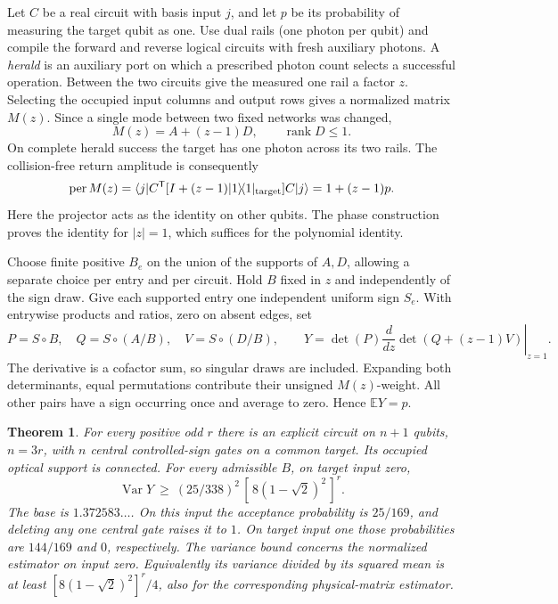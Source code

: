 \documentclass[11pt]{article}
\newtheorem{theorem}{Theorem}
\DeclareMathOperator{\per}{per}
\DeclareMathOperator{\Var}{Var}
\newcommand{\E}{\mathbb E}
\newcommand{\ket}[1]{\lvert #1\rangle}
\newcommand{\bra}[1]{\langle #1\rvert}
\begin{document}
Let \(C\) be a real circuit with basis input \(j\), and let \(p\) be its probability of measuring the target qubit as one. Use dual rails (one photon per qubit) and compile the forward and reverse logical circuits with fresh auxiliary photons. A \emph{herald} is an auxiliary port on which a prescribed photon count selects a successful operation. Between the two circuits give the measured one rail a factor \(z\). Selecting the occupied input columns and output rows gives a normalized matrix \(M(z)\). Since a single mode between two fixed networks was changed,
\[
 M(z)=A+(z-1)D,\qquad \operatorname{rank}D\le1.
\]
On complete herald success the target has one photon across its two rails. The collision-free return amplitude is consequently
\begin{equation}
 \per M(z)=\bra j C^\mathsf T[I+(z-1)\ket1\!\bra1_{\rm target}]C\ket j
          =1+(z-1)p. \label{eq:mark}
\end{equation}
Here the projector acts as the identity on other qubits. The phase construction proves the identity for \(|z|=1\), which suffices for the polynomial identity.

Choose finite positive \(B_e\) on the union of the supports of \(A,D\), allowing a separate choice per entry and per circuit. Hold \(B\) fixed in \(z\) and independently of the sign draw. Give each supported entry one independent uniform sign \(S_e\). With entrywise products and ratios, zero on absent edges, set
\[
 P=S\circ B,\quad Q=S\circ(A/B),\quad V=S\circ(D/B),\qquad
 Y=\det(P)\left.\frac{d}{dz}\det(Q+(z-1)V)\right|_{z=1}.
\]
The derivative is a cofactor sum, so singular draws are included. Expanding both determinants, equal permutations contribute their unsigned \(M(z)\)-weight. All other pairs have a sign occurring once and average to zero. Hence \(\E Y=p\).

\begin{theorem}\label{thm:main}
For every positive odd \(r\) there is an explicit circuit on \(n+1\) qubits, \(n=3r\), with \(n\) central controlled-sign gates on a common target. Its occupied optical support is connected. For every admissible \(B\), on target input zero,
\[
 \Var Y\ \ge\ (25/338)^2\, [\,8(1-\sqrt2)^2\,]^r .
\]
The base is \(1.372583\ldots\). On this input the acceptance probability is \(25/169\), and deleting any one central gate raises it to \(1\). On target input one those probabilities are \(144/169\) and \(0\), respectively. The variance bound concerns the normalized estimator on input zero. Equivalently its variance divided by its squared mean is at least \([8(1-\sqrt2)^2]^r/4\), also for the corresponding physical-matrix estimator.
\end{theorem}
\end{document}
